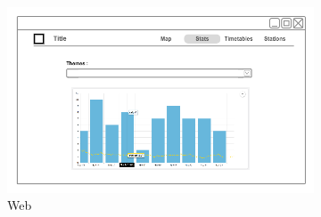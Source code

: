 \begin{figure}[ht]
    \centering
    \begin{subfigure}[b]{0.6\textwidth}
        \includegraphics[width=\textwidth]
          {img/c02-application/png/web-website-stats.png}
        \caption{Web}
    \end{subfigure}
    ~
    \begin{subfigure}[b]{0.2\textwidth}

\end{subfigure}
\end{figure}
